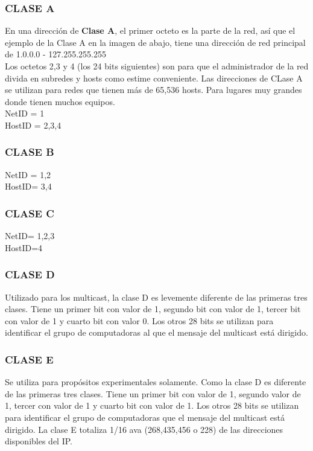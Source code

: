 \documentclass[letterpaper,12pt]{article}
\begin{document}
\begin{sloppypar}
\subsubsection{CLASE A}
En una dirección de \textbf{Clase A}, el primer octeto es la parte de la red, así que el ejemplo de la Clase A en la imagen de abajo, tiene una dirección de red principal de 1.0.0.0 - 127.255.255.255 
\vspace{0.3cm}\\ 
Los octetos 2,3 y 4 (los 24 bits siguientes) son para que el administrador de la red divida en subredes y hosts como estime conveniente. Las direcciones de CLase A se utilizan para redes que tienen más de 65,536 hosts. Para lugares muy grandes donde tienen muchos equipos.
\vspace{0.3cm}\\ 
NetID = 1
\vspace{0.3cm}\\ 
HostID = 2,3,4

\subsubsection{CLASE B}
NetID = 1,2
\vspace{0.3cm}\\ 
HostID= 3,4

\subsubsection{CLASE C}
NetID= 1,2,3
\vspace{0.3cm}\\ 
HostID=4

\subsubsection{CLASE D}
Utilizado para los multicast, la clase D es levemente diferente de las primeras tres clases. Tiene un primer bit con valor de 1, segundo bit con valor de 1, tercer bit con valor de 1 y cuarto bit con valor 0. Los otros 28 bits se utilizan para identificar el grupo de computadoras al que el mensaje del multicast está dirigido.

\subsubsection{CLASE E}
Se utiliza para propósitos experimentales solamente. Como la clase D es diferente de las primeras tres clases. Tiene un primer bit con valor de 1, segundo valor de 1, tercer con valor de 1 y cuarto bit con valor de 1. Los otros 28 bits se utilizan para identificar el grupo de computadoras que el mensaje del multicast está dirigido. La clase E totaliza 1/16 ava (268,435,456 o 228) de las direcciones disponibles del IP.


\end{sloppypar}
\end{document}

